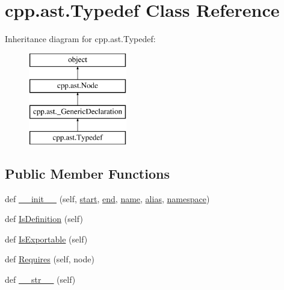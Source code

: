 \hypertarget{classcpp_1_1ast_1_1_typedef}{}\section{cpp.\+ast.\+Typedef Class Reference}
\label{classcpp_1_1ast_1_1_typedef}
Inheritance diagram for cpp.\+ast.\+Typedef\+:\begin{figure}[H]
\begin{center}
\leavevmode
\includegraphics[height=4.000000cm]{d4/d8c/classcpp_1_1ast_1_1_typedef}
\end{center}
\end{figure}
\subsection*{Public Member Functions}
\begin{DoxyCompactItemize}
\item 
def \mbox{\hyperlink{classcpp_1_1ast_1_1_typedef_af3275d2390190a074de470c1424e05e0}{\+\_\+\+\_\+init\+\_\+\+\_\+}} (self, \mbox{\hyperlink{classcpp_1_1ast_1_1_node_a7b2aa97e6a049bb1a93aea48c48f1f44}{start}}, \mbox{\hyperlink{classcpp_1_1ast_1_1_node_a3c5e5246ccf619df28eca02e29d69647}{end}}, \mbox{\hyperlink{classcpp_1_1ast_1_1___generic_declaration_af774f4729dfd78d0538a6782fe8514c1}{name}}, \mbox{\hyperlink{classcpp_1_1ast_1_1_typedef_a3187a504dfbefe50b866b44902823c30}{alias}}, \mbox{\hyperlink{classcpp_1_1ast_1_1___generic_declaration_a8aee3f11b37449d54b42a78e0a689f46}{namespace}})
\item 
def \mbox{\hyperlink{classcpp_1_1ast_1_1_typedef_a103bf391e665884bfbfd20fc5e6d1a19}{Is\+Definition}} (self)
\item 
def \mbox{\hyperlink{classcpp_1_1ast_1_1_typedef_adee58e4674b049d8e4435b5b6ad8e1d4}{Is\+Exportable}} (self)
\item 
def \mbox{\hyperlink{classcpp_1_1ast_1_1_typedef_aa9f65f4a97ba340f2c9ebc5e7ce27e8c}{Requires}} (self, node)
\item 
def \mbox{\hyperlink{classcpp_1_1ast_1_1_typedef_a451920900affc5f12e38ab8fbf5e3dea}{\+\_\+\+\_\+str\+\_\+\+\_\+}} (self)
\end{DoxyCompactItemize}
